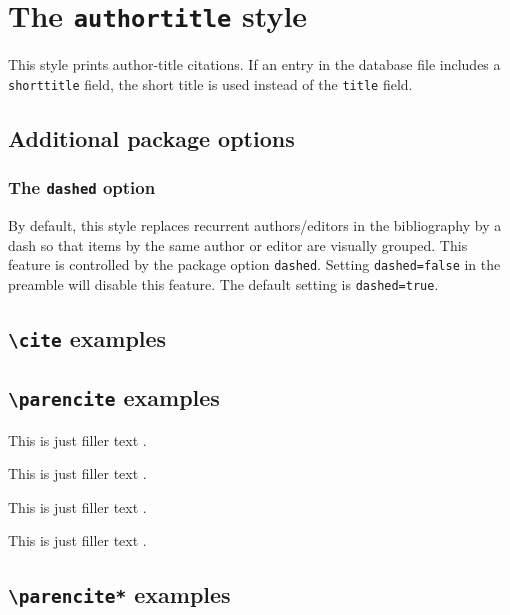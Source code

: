 \documentclass[a4paper]{article}
\newcommand{\cmd}[1]{\texttt{\textbackslash #1}}
\begin{document}
\section*{The \texttt{authortitle} style}

This style prints author-title citations. If an entry in the
database file includes a \texttt{shorttitle} field, the short
title is used instead of the \texttt{title} field.

\subsection*{Additional package options}

\subsubsection*{The \texttt{dashed} option}

By default, this style replaces recurrent authors/editors in the
bibliography by a dash so that items by the same author or editor
are visually grouped. This feature is controlled by the package
option \texttt{dashed}. Setting \texttt{dashed=false} in the
preamble will disable this feature. The default setting is
\texttt{dashed=true}.

\subsection*{\cmd{cite} examples}

\cite{aristotle:rhetoric}

\cite[59]{aristotle:rhetoric}

\cite[see][]{aristotle:rhetoric}

\cite[see][59--63]{aristotle:rhetoric}

\subsection*{\cmd{parencite} examples}

This is just filler text \parencite{aristotle:rhetoric}.

This is just filler text \parencite[59]{aristotle:rhetoric}.

This is just filler text \parencite[see][]{aristotle:rhetoric}.

This is just filler text \parencite[see][59--63]{aristotle:rhetoric}.

\subsection*{\cmd{parencite*} examples}
\end{document}
